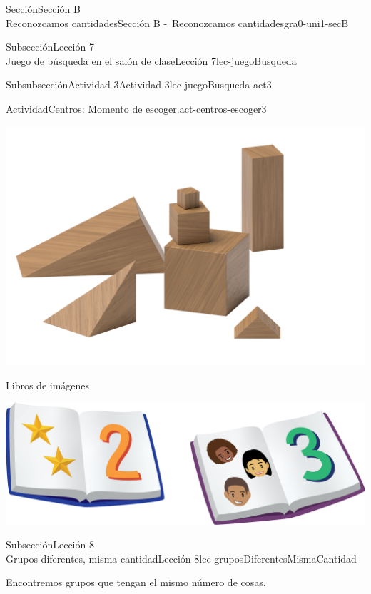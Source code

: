 \begin{sectionptx}{Sección}{{\Large Sección B\\}Reconozcamos cantidades}{}{Sección B -~Reconozcamos cantidades}{}{}{gra0-uni1-secB}
\begin{subsectionptx}{Subsección}{{\normalsize Lección 7\\[-0.05cm]}Juego de búsqueda en el salón de clase}{}{Lección 7}{}{}{lec-juegoBusqueda}
\begin{subsubsectionptx}{Subsubsección}{Actividad 3}{}{Actividad 3}{}{}{lec-juegoBusqueda-act3}
\begin{activity}{Actividad}{Centros: Momento de escoger.}{act-centros-escoger3}
\begin{sidebyside}{2}{0.025}{0.025}{0.05}
\begin{sbspanel}{0.45}
\includegraphics[max width=\linewidth, center]{external/png-source/K.1.A Beta Student Workbook.Geoblocks.png}
\end{sbspanel}%
\begin{sbspanel}{0.45}%
Libros de imágenes%
\par
\includegraphics[max width=\linewidth, center]{external/png-source/K.1.D Beta Student Workbooks.Books.png}
\end{sbspanel}%
\end{sidebyside}%
\end{activity}%
\end{subsubsectionptx}
\end{subsectionptx}
%
%
\typeout{************************************************}
\typeout{************************************************}
%
\begin{subsectionptx}{Subsección}{{\normalsize Lección 8\\[-0.05cm]}Grupos diferentes, misma cantidad}{}{Lección 8}{}{}{lec-gruposDiferentesMismaCantidad}
\begin{introduction}{}%
Encontremos grupos que tengan el mismo número de cosas.%
\end{introduction}%

\end{subsectionptx}
\end{sectionptx}
